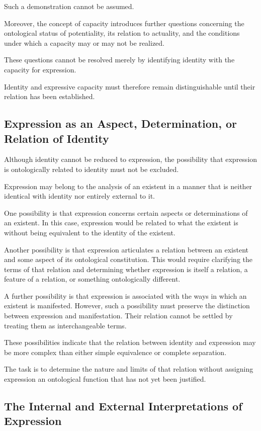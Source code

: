 Such a demonstration cannot be assumed.

Moreover, the concept of capacity introduces further
questions concerning the ontological status of
potentiality, its relation to actuality, and the
conditions under which a capacity may or may not
be realized.

These questions cannot be resolved merely by
identifying identity with the capacity for expression.

Identity and expressive capacity must therefore
remain distinguishable until their relation has
been established.

\subsection{Expression as an Aspect, Determination, or Relation of Identity}

Although identity cannot be reduced to expression,
the possibility that expression is ontologically
related to identity must not be excluded.

Expression may belong to the analysis of an existent
in a manner that is neither identical with identity
nor entirely external to it.

One possibility is that expression concerns certain
aspects or determinations of an existent. In this case,
expression would be related to what the existent is
without being equivalent to the identity of the existent.

Another possibility is that expression articulates
a relation between an existent and some aspect of
its ontological constitution. This would require
clarifying the terms of that relation and determining
whether expression is itself a relation, a feature
of a relation, or something ontologically different.

A further possibility is that expression is associated
with the ways in which an existent is manifested.
However, such a possibility must preserve the distinction
between expression and manifestation. Their relation
cannot be settled by treating them as interchangeable
terms.

These possibilities indicate that the relation between
identity and expression may be more complex than
either simple equivalence or complete separation.

The task is to determine the nature and limits of
that relation without assigning expression an
ontological function that has not yet been justified.

\subsection{The Internal and External Interpretations of Expression}

